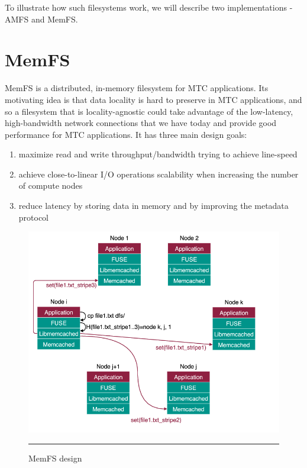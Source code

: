 To illustrate how such filesystems work, we will describe two implementations - AMFS\cite{amfs} and MemFS\cite{memfs}.

\section{MemFS}

MemFS\cite{memfs} is a distributed, in-memory filesystem for MTC applications. Its motivating idea is that data locality is hard to preserve in MTC applications, and so a filesystem that is locality-agnostic could take advantage of the low-latency, high-bandwidth network connections that we have today and provide good performance for MTC applications. It has three main design goals:

\begin{enumerate}

\item maximize read and write throughput/bandwidth trying to achieve line-speed
\item achieve close-to-linear I/O operations scalability when increasing the number of compute nodes
\item reduce latency by storing data in memory and by improving the metadata protocol

\end{enumerate}

\begin{figure}[H]
  \centering
    \includegraphics[scale=0.5]{Figures/memfs.png}
    \rule{25em}{0.5pt}
  \caption[MemFS design]{MemFS design}
  \label{fig:memfs}
\end{figure}


